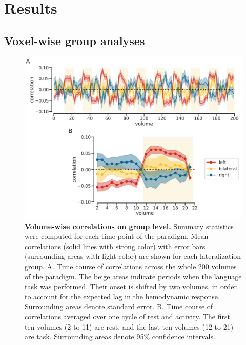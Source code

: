 \documentclass[fleqn,10pt]{SelfArx} %
\begin{document}
\section{Results}

\subsection{Voxel-wise group analyses} \label{Voxel-wise group analyses}

	
	\begin{figure}[htb]
		\begin{minipage}{\textwidth}
			\renewcommand{\familydefault}{\sfdefault}\normalfont
			\centering
			\includegraphics[width=0.95\columnwidth]{../reports/figures/12-all-timecourses.png}
			\caption{\textbf{Volume-wise correlations on group level.} 
				Summary statistics were computed for each time point of the paradigm. Mean correlations (solid lines with strong color) with error bars (surrounding areas with light color) are shown for each lateralization group.
				A. Time course of correlations across the whole 200 volumes of the paradigm. The beige areas indicate periods when the language task was performed. Their onset is shifted by two volumes, in order to account for the expected lag in the hemodynamic response. Surrounding areas denote standard error.
				B. Time course of correlations averaged over one cycle of rest and activity. The first ten volumes (2 to 11) are rest, and the last ten volumes (12 to 21) are task. Surrounding areas denote 95\% confidence intervals.}%
			\label{fig:time}
		\end{minipage}
	\end{figure}
	
\end{document}
